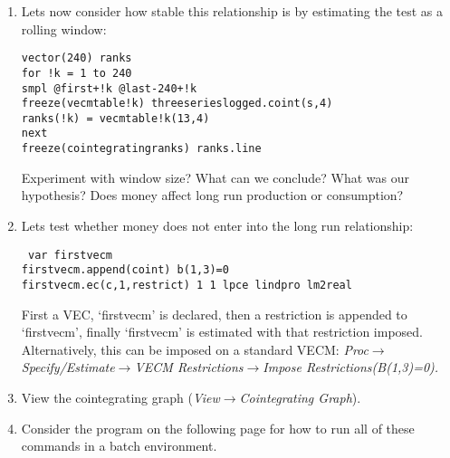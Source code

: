 \documentclass[a4paper,11pt]{article}
\begin{document}
\begin{enumerate}
\begin{center}
\end{center}
\item Lets now consider how stable this relationship is by estimating the test as a rolling window:
\begin{center}
\texttt{vector(240) ranks\\
for !k = 1 to 240\\
smpl @first+!k @last-240+!k\\
freeze(vecmtable{!k}) threeserieslogged.coint(s,4)\\
ranks(!k) = vecmtable{!k}(13,4)\\
next\\
freeze(cointegratingranks) ranks.line}
\end{center}
Experiment with window size? What can we conclude? What was our hypothesis? Does money affect long run production or consumption?
\item Lets test whether money does not enter into the long run relationship:
\begin{center}
\texttt{
var firstvecm\\
firstvecm.append(coint) b(1,3)=0\\
firstvecm.ec(c,1,restrict) 1 1 lpce lindpro lm2real
}
\end{center}
First a VEC, `firstvecm' is declared, then a restriction is appended to `firstvecm', finally `firstvecm' is estimated with that restriction imposed. Alternatively, this can be imposed on a standard VECM: \emph{Proc}$\rightarrow$\emph{Specify/Estimate}$\rightarrow$\emph{VECM Restrictions}$\rightarrow$\emph{Impose Restrictions(B(1,3)=0).}
\item View the cointegrating graph (\emph{View}$\rightarrow$\emph{Cointegrating Graph}).
\item Consider the program on the following page for how to run all of these commands in a batch environment.
\end{enumerate}
\newpage
\end{document}
